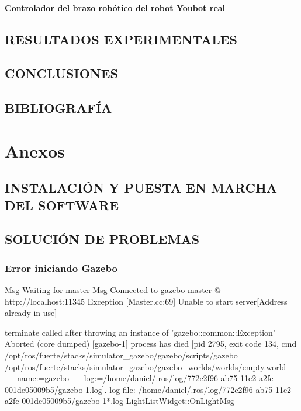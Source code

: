 \documentclass[10pt, a4paper]{report}
\begin{document}
\subsection{Controlador del brazo robótico del robot Youbot real}


\chapter{RESULTADOS EXPERIMENTALES}



\chapter{CONCLUSIONES}



\chapter{BIBLIOGRAFÍA}



\part{Anexos}

\appendix

\chapter{INSTALACIÓN Y PUESTA EN MARCHA DEL SOFTWARE}

\chapter{SOLUCIÓN DE PROBLEMAS}

\section{Error iniciando Gazebo}

\begin{spverbatim}
Msg Waiting for master
Msg Connected to gazebo master @ http://localhost:11345
Exception [Master.cc:69] Unable to start server[Address already in use]


terminate called after throwing an instance of 'gazebo::common::Exception'
Aborted (core dumped)
[gazebo-1] process has died [pid 2795, exit code 134, cmd /opt/ros/fuerte/stacks/simulator_gazebo/gazebo/scripts/gazebo /opt/ros/fuerte/stacks/simulator_gazebo/gazebo_worlds/worlds/empty.world __name:=gazebo __log:=/home/daniel/.ros/log/772c2f96-ab75-11e2-a2fc-001de05009b5/gazebo-1.log].
log file: /home/daniel/.ros/log/772c2f96-ab75-11e2-a2fc-001de05009b5/gazebo-1*.log
LightListWidget::OnLightMsg
\end{spverbatim}
\end{document}
